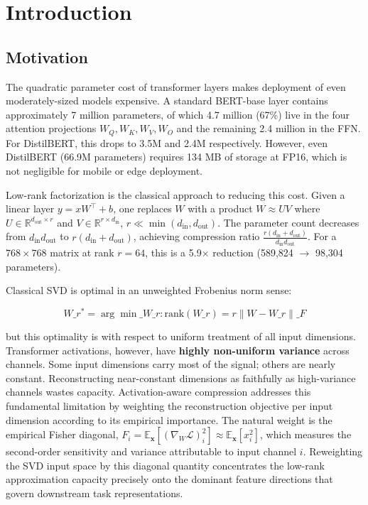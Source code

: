 
\section{Introduction}

\subsection{Motivation}

The quadratic parameter cost of transformer layers makes deployment of even 
moderately-sized models expensive. A standard BERT-base layer contains 
approximately 7 million parameters, of which 4.7 million (67\%) live in the 
four attention projections $W_Q, W_K, W_V, W_O$ and the remaining 2.4 million 
in the FFN. For DistilBERT, this drops to 3.5M and 2.4M respectively. However, 
even DistilBERT (66.9M parameters) requires 134 MB of storage at FP16, which 
is not negligible for mobile or edge deployment.

Low-rank factorization is the classical approach to reducing this cost. Given 
a linear layer $y = x W^\top + b$, one replaces $W$ with a product $W \approx U V$ 
where $U \in \mathbb{R}^{d_\text{out} \times r}$ and $V \in \mathbb{R}^{r \times d_\text{in}}$, 
$r \ll \min(d_\text{in}, d_\text{out})$. The parameter count decreases from 
$d_\text{in} d_\text{out}$ to $r(d_\text{in} + d_\text{out})$, achieving 
compression ratio $\frac{r(d_\text{in} + d_\text{out})}{d_\text{in} d_\text{out}}$. 
For a $768 \times 768$ matrix at rank $r = 64$, this is a 5.9$\times$ reduction 
(589,824 $\to$ 98,304 parameters).

Classical SVD is optimal in an unweighted Frobenius norm sense:

\[
W\_r^* = \arg\min\_{W\_r : \text{rank}(W\_r) = r} \|W - W\_r\|\_F
\tag{1.1}
\]

but this optimality is with respect to uniform treatment of all input 
dimensions. Transformer activations, however, have \textbf{highly non-uniform 
variance} across channels. Some input dimensions carry most of the signal; 
others are nearly constant. Reconstructing near-constant dimensions as faithfully as high-variance channels wastes capacity.
Activation-aware compression addresses this fundamental limitation by weighting the reconstruction 
objective per input dimension according to its empirical importance. The natural weight is the empirical Fisher 
diagonal, $F_i = \mathbb{E}_{\mathbf{x}} [(\nabla_{W} \mathcal{L})_{i}^2] \approx \mathbb{E}_{\mathbf{x}}[x_i^2]$, 
which measures the second-order sensitivity and variance attributable to input channel $i$. 
Reweighting the SVD input space by this diagonal quantity concentrates the low-rank approximation 
capacity precisely onto the dominant feature directions that govern downstream task representations.

